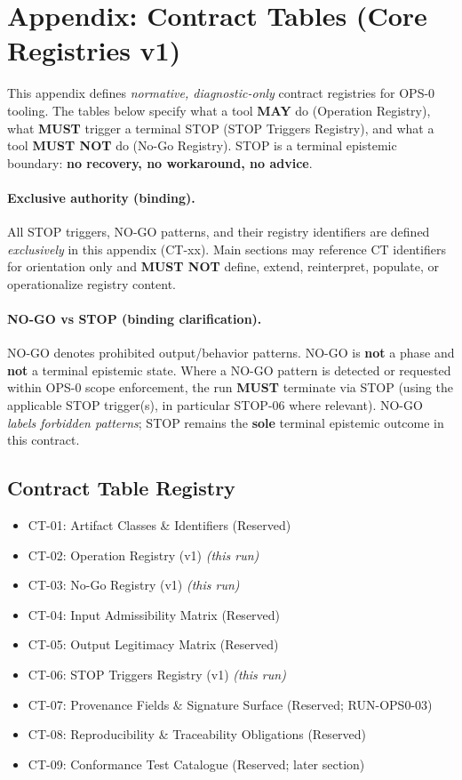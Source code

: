 ﻿\appendix
\section{Appendix: Contract Tables (Core Registries v1)}
\label{sec:ops0_contract_tables}

This appendix defines \emph{normative, diagnostic-only} contract registries for OPS-0 tooling.
The tables below specify what a tool \textbf{MAY} do (Operation Registry), what \textbf{MUST} trigger
a terminal STOP (STOP Triggers Registry), and what a tool \textbf{MUST NOT} do (No-Go Registry).
STOP is a terminal epistemic boundary: \textbf{no recovery, no workaround, no advice}.

\paragraph{Exclusive authority (binding).}
All STOP triggers, NO-GO patterns, and their registry identifiers are defined \emph{exclusively} in this appendix (CT-xx).
Main sections may reference CT identifiers for orientation only and \textbf{MUST NOT} define, extend, reinterpret, populate,
or operationalize registry content.

\paragraph{NO-GO vs STOP (binding clarification).}
NO-GO denotes prohibited output/behavior patterns. NO-GO is \textbf{not} a phase and \textbf{not} a terminal epistemic state.
Where a NO-GO pattern is detected or requested within OPS-0 scope enforcement, the run \textbf{MUST} terminate via STOP
(using the applicable STOP trigger(s), in particular STOP-06 where relevant). NO-GO \emph{labels forbidden patterns};
STOP remains the \textbf{sole} terminal epistemic outcome in this contract.

\subsection{Contract Table Registry}
\begin{itemize}
  \item CT-01: Artifact Classes \& Identifiers (Reserved)
  \item CT-02: Operation Registry (v1) \hfill \emph{(this run)}
  \item CT-03: No-Go Registry (v1) \hfill \emph{(this run)}
  \item CT-04: Input Admissibility Matrix (Reserved)
  \item CT-05: Output Legitimacy Matrix (Reserved)
  \item CT-06: STOP Triggers Registry (v1) \hfill \emph{(this run)}
  \item CT-07: Provenance Fields \& Signature Surface (Reserved; RUN-OPS0-03)
  \item CT-08: Reproducibility \& Traceability Obligations (Reserved)
  \item CT-09: Conformance Test Catalogue (Reserved; later section)
\end{itemize}

